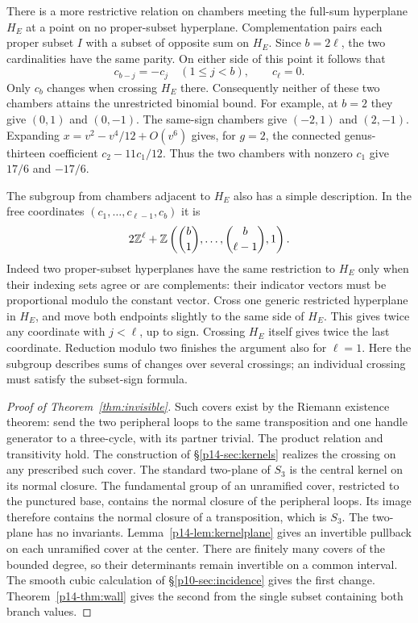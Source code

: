 There is a more restrictive relation on chambers meeting the full-sum
hyperplane \(H_E\) at a point on no proper-subset hyperplane.
Complementation pairs each proper subset \(I\) with a subset of
opposite sum on \(H_E\). Since \(b=2\ell\), the two cardinalities
have the same parity. On either side of this point it follows that
\[
             c_{b-j}=-c_j\quad(1\leq j<b),\qquad c_\ell=0 .
\]
Only \(c_b\) changes when crossing \(H_E\) there. Consequently neither
of these two chambers attains the unrestricted binomial bound.
For example, at \(b=2\) they give \((0,1)\) and \((0,-1)\). The
same-sign chambers give \((-2,1)\) and \((2,-1)\). Expanding
\(x=v^2-v^4/12+O(v^6)\) gives, for \(g=2\), the connected
genus-thirteen coefficient \(c_2-11c_1/12\). Thus the two chambers
with nonzero \(c_1\) give \(17/6\) and \(-17/6\).

The subgroup from chambers adjacent to \(H_E\) also has a simple
description. In the free coordinates \((c_1,\ldots,c_{\ell-1},c_b)\)
it is
\[
 2\mathbb Z^\ell+\mathbb Z\left(\binom b1,\ldots,\binom b{\ell-1},1\right).
\]
Indeed two proper-subset hyperplanes have the same restriction to
\(H_E\) only when their indexing sets agree or are complements:
their indicator vectors must be proportional modulo the constant vector.
Cross one generic restricted hyperplane in \(H_E\), and move both
endpoints slightly to the same side of \(H_E\). This gives twice any
coordinate with \(j<\ell\), up to sign. Crossing \(H_E\) itself gives
twice the last coordinate. Reduction modulo two finishes the argument
also for \(\ell=1\). Here the subgroup describes sums of changes over
several crossings; an individual crossing must satisfy the subset-sign
formula.

\begin{proof}[Proof of Theorem~\ref{thm:invisible}]
Such covers exist by the Riemann existence theorem: send the two peripheral loops to the same transposition and one handle generator to a three-cycle, with its partner trivial. The product relation and transitivity hold. The construction of \S\ref{p14-sec:kernels} realizes the crossing on any prescribed such cover. The standard two-plane of \(S_3\) is the central kernel on its normal closure. The fundamental group of an unramified cover, restricted to the punctured base, contains the normal closure of the peripheral loops. Its image therefore contains the normal closure of a transposition, which is \(S_3\). The two-plane has no invariants. Lemma~\ref{p14-lem:kernelplane} gives an invertible pullback on each unramified cover at the center. There are finitely many covers of the bounded degree, so their determinants remain invertible on a common interval. The smooth cubic calculation of \S\ref{p10-sec:incidence} gives the first change. Theorem~\ref{p14-thm:wall} gives the second from the single subset containing both branch values.
\end{proof}
